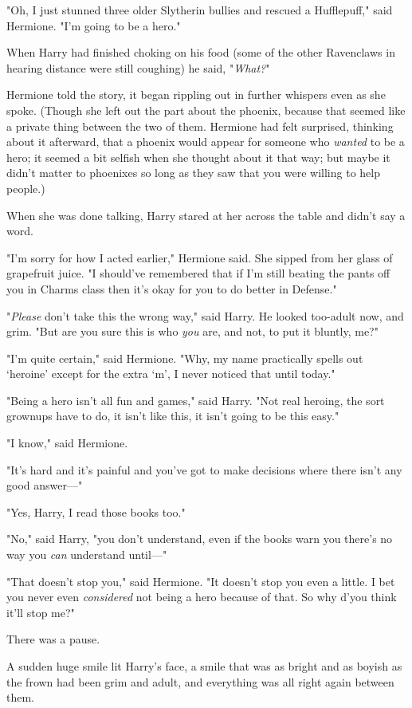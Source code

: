 "Oh, I just stunned three older Slytherin bullies and rescued a Hufflepuff,"
said Hermione. "I'm going to be a hero."

When Harry had finished choking on his food (some of the other Ravenclaws in
hearing distance were still coughing) he said, "\emph{What?}"

Hermione told the story, it began rippling out in further whispers even as she
spoke. (Though she left out the part about the phoenix, because that seemed
like a private thing between the two of them. Hermione had felt surprised,
thinking about it afterward, that a phoenix would appear for someone who
\emph{wanted} to be a hero; it seemed a bit selfish when she thought about it
that way; but maybe it didn't matter to phoenixes so long as they saw that you
were willing to help people.)

When she was done talking, Harry stared at her across the table and didn't say
a word.

"I'm sorry for how I acted earlier," Hermione said. She sipped from her glass
of grapefruit juice. "I should've remembered that if I'm still beating the
pants off you in Charms class then it's okay for you to do better in Defense."

"\emph{Please} don't take this the wrong way," said Harry. He looked too-adult
now, and grim. "But are you sure this is who \emph{you} are, and not, to put it
bluntly, me?"

"I'm quite certain," said Hermione. "Why, my name practically spells out
`heroine' except for the extra `m', I never noticed that until today."

"Being a hero isn't all fun and games," said Harry. "Not real heroing, the sort
grownups have to do, it isn't like this, it isn't going to be this easy."

"I know," said Hermione.

"It's hard and it's painful and you've got to make decisions where there isn't
any good answer---"

"Yes, Harry, I read those books too."

"No," said Harry, "you don't understand, even if the books warn you there's no
way you \emph{can} understand until---"

"That doesn't stop you," said Hermione. "It doesn't stop you even a little. I
bet you never even \emph{considered} not being a hero because of that. So why
d'you think it'll stop me?"

There was a pause.

A sudden huge smile lit Harry's face, a smile that was as bright and as boyish
as the frown had been grim and adult, and everything was all right again
between them.


